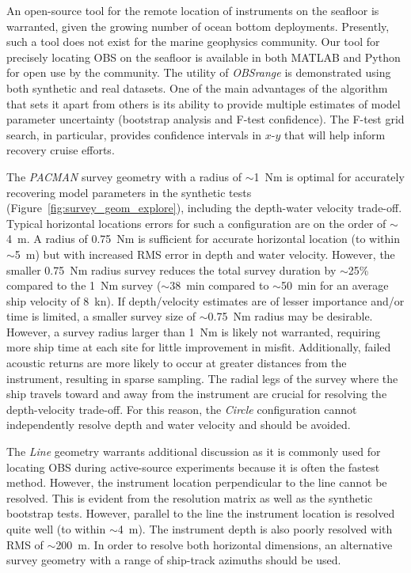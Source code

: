 An open-source tool for the remote location of instruments on the seafloor is warranted, given the growing number of ocean bottom deployments. Presently, such a tool does not exist for the marine geophysics community. Our tool for precisely locating OBS on the seafloor is available in both MATLAB and Python for open use by the community. The utility of \textit{OBSrange} is demonstrated using both synthetic and real datasets. One of the main advantages of the algorithm that sets it apart from others is its ability to provide multiple estimates of model parameter uncertainty (bootstrap analysis and F-test confidence). The F-test grid search, in particular, provides confidence intervals in $x$-$y$ that will help inform recovery cruise efforts.

The \textit{PACMAN} survey geometry with a radius of $\sim$1~Nm is optimal for accurately recovering model parameters in the synthetic tests (Figure~\ref{fig:survey_geom_explore}), including the depth-water velocity trade-off. Typical horizontal locations errors for such a configuration are on the order of $\sim$4~m. A radius of 0.75~Nm is sufficient for accurate horizontal location (to within $\sim$5~m) but with increased RMS error in depth and water velocity. However, the smaller 0.75~Nm radius survey reduces the total survey duration by $\sim$25\% compared to the 1~Nm survey ($\sim$38~min compared to $\sim$50~min for an average ship velocity of 8~kn). If depth/velocity estimates are of lesser importance and/or time is limited, a smaller survey size of $\sim$0.75~Nm radius may be desirable. However, a survey radius larger than 1~Nm is likely not warranted, requiring more ship time at each site for little improvement in misfit. Additionally, failed acoustic returns are more likely to occur at greater distances from the instrument, resulting in sparse sampling. The radial legs of the survey where the ship travels toward and away from the instrument are crucial for resolving the depth-velocity trade-off. For this reason, the \textit{Circle} configuration cannot independently resolve depth and water velocity and should be avoided.

The \textit{Line} geometry warrants additional discussion as it is commonly used for locating OBS during active-source experiments because it is often the fastest method. However, the instrument location perpendicular to the line cannot be resolved. This is evident from the resolution matrix as well as the synthetic bootstrap tests. However, parallel to the line the instrument location is resolved quite well (to within $\sim$4~m). The instrument depth is also poorly resolved with RMS of $\sim$200~m. In order to resolve both horizontal dimensions, an alternative survey geometry with a range of ship-track azimuths should be used.

